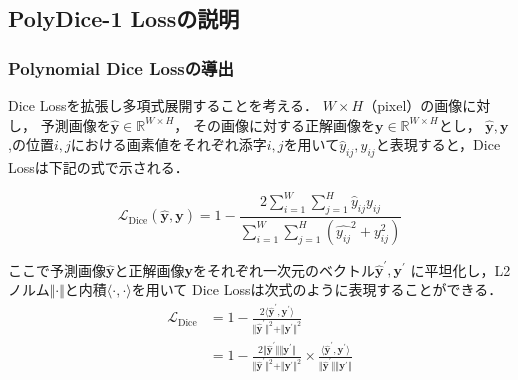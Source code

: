 \documentclass[10pt, a4paper, twocolumn]{jarticle}
\begin{document}
\subsection{PolyDice-1 Lossの説明}

\subsubsection{Polynomial Dice Lossの導出}
Dice Lossを拡張し多項式展開することを考える．
$W \times H$（pixel）の画像に対し，
予測画像を$\hat{\mathbf{y}} \in \mathbb R ^ {W \times H}$，
その画像に対する正解画像を$\mathbf{y} \in \mathbb R ^ {W \times H}$とし，
$\hat{\mathbf{y}}, \mathbf{y}$,の位置$i, j$における画素値をそれぞれ添字$i, j$を用いて$\hat{y}_{ij}, {y}_{ij}$と表現すると，Dice Lossは下記の式で示される．

\begin{equation}
  \mathcal{L}_{\text{Dice}}(\hat{\mathbf{y}}, \mathbf{y}) = 1 - \frac{2 \sum_{i=1}^{W} \sum_{j=1}^{H} \hat{y}_{ij} y_{ij}}{\sum_{i=1}^{W} \sum_{j=1}^{H}(\hat{y_{ij}} ^ 2 + y_{ij} ^ 2)}
\end{equation}

ここで予測画像$\hat{\mathbf{y}}$と正解画像$\mathbf{y}$をそれぞれ一次元のベクトル$\hat{\mathbf{y}} ^ {\prime}, {\mathbf{y}} ^ {\prime}$
に平坦化し，L2ノルム$\Vert \cdot \Vert$と内積$\langle \cdot, \cdot \rangle $を用いて
Dice Lossは次式のように表現することができる．
\begin{equation}
  \begin{aligned}
    \mathcal{L}_{\text{Dice}} &= 1 - \frac{2 \langle \hat{\mathbf{y}} ^ {\prime}, {\mathbf{y}} ^ {\prime} \rangle}{\Vert \hat{\mathbf{y}} ^ {\prime} \Vert ^ 2 + \Vert {\mathbf{y}} ^ {\prime} \Vert ^ 2} \\
    &= 1 - \frac{2 \Vert \hat{\mathbf{y}} ^ {\prime} \Vert \Vert {\mathbf{y}} ^ {\prime} \Vert}{\Vert \hat{\mathbf{y}} ^ {\prime} \Vert ^ 2 + \Vert {\mathbf{y}} ^ {\prime} \Vert ^ 2}
    \times \frac{\langle \hat{\mathbf{y}} ^ {\prime}, {\mathbf{y}} ^ {\prime} \rangle}{\Vert \hat{\mathbf{y}} ^ {\prime} \Vert \Vert {\mathbf{y}} ^ {\prime} \Vert}
  \end{aligned}
\end{equation}
\end{document}
